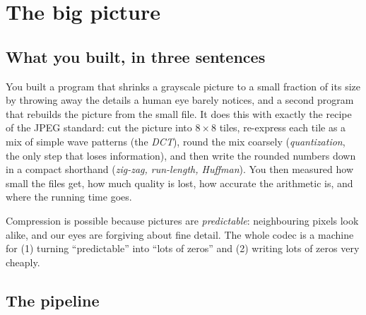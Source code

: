 \chapter{The big picture}

\section{What you built, in three sentences}

You built a program that shrinks a grayscale picture to a small fraction of its size by throwing away the details a human eye barely notices, and a second program that rebuilds the picture from the small file.
It does this with exactly the recipe of the JPEG standard: cut the picture into $8\times 8$ tiles, re-express each tile as a mix of simple wave patterns (the \emph{DCT}), round the mix coarsely (\emph{quantization}, the only step that loses information), and then write the rounded numbers down in a compact shorthand (\emph{zig-zag, run-length, Huffman}).
You then measured how small the files get, how much quality is lost, how accurate the arithmetic is, and where the running time goes.

\begin{plain}
Compression is possible because pictures are \emph{predictable}: neighbouring pixels look alike, and our eyes are forgiving about fine detail.
The whole codec is a machine for (1) turning ``predictable'' into ``lots of zeros'' and (2) writing lots of zeros very cheaply.
\end{plain}

\section{The pipeline}

